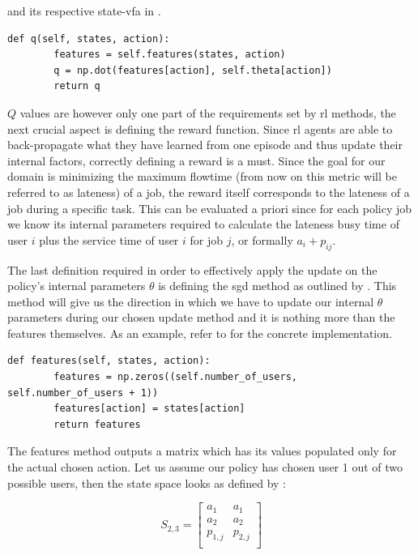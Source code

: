 \documentclass[draft=false]{seal_thesis}
\begin{document}
and its respective state-\gls{vfa} in .

\begin{lstlisting}[caption=State-\gls{vfa},label=lst:value_f_approx,style=CustomPython]
    def q(self, states, action):
        features = self.features(states, action)
        q = np.dot(features[action], self.theta[action])
        return q
\end{lstlisting}
 
 $Q$ values are however only one part of the requirements set by \gls{rl} methods, the next crucial aspect is defining the reward function. Since \gls{rl} agents are able to back-propagate what they have learned from one episode and thus update their internal factors, correctly defining a reward is a must. Since the goal for our domain is minimizing the maximum flowtime (from now on this metric will be referred to as lateness) of a job, the reward itself corresponds to the lateness of a job during a specific task. This can be evaluated a priori since for each policy job we know its internal parameters required to calculate the lateness \ie busy time of user $i$ plus the service time of user $i$ for job $j$, or formally $a_i+p_{ij}$.

 The last definition required in order to effectively apply the update on the policy's internal parameters $\theta$ is defining the \gls{sgd} method as outlined by . This method will give us the direction in which we have to update our internal $\theta$ parameters during our chosen update method and it is nothing more than the features themselves. As an example, refer to  for the concrete implementation.

 \begin{lstlisting}[caption=Features definition,label=lst:features_definition,style=CustomPython]
    def features(self, states, action):
        features = np.zeros((self.number_of_users, self.number_of_users + 1))
        features[action] = states[action]
        return features
\end{lstlisting}

The features method outputs a matrix which has its values populated only for the actual chosen action. Let us assume our policy has chosen user 1 out of two possible users, then the state space looks as defined by :

\begin{equation}
\label{eq:kbatch_sp_ex}
	S_{2,3} = 
	\begin{bmatrix}
	a_1 & a_1 \\
	a_2 & a_2 \\
	p_{1,j} & p_{2,j} \\
	\end{bmatrix}
\end{equation}
\end{document}
